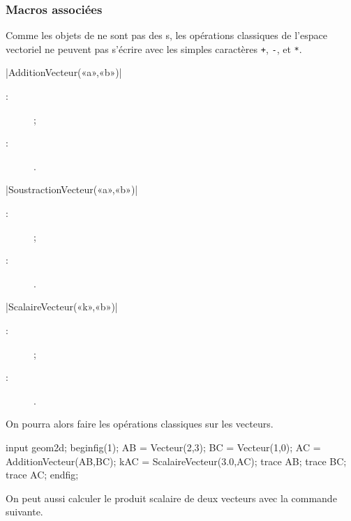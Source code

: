 \documentclass[a4paper,french]{article}
\begin{document}
\subsubsection{Macros associées}

Comme les objets de \mpgeomdd ne sont pas des s, les opérations classiques
de l'espace vectoriel ne peuvent pas s'écrire avec les simples caractères
\lstinline-+-, \lstinline+-+, et \lstinline-*-.

\begin{colourband}
\macro|AdditionVecteur(«a»,«b»)|
\begin{description}
  \item[:]  ;
  \item[:] .
\end{description}
\end{colourband}
\bigskip


\begin{colourband}
\macro|SoustractionVecteur(«a»,«b»)|
\begin{description}
  \item[:]  ;
  \item[:] .
\end{description}
\end{colourband}
\bigskip


\begin{colourband}
\macro|ScalaireVecteur(«k»,«b»)|
\begin{description}
  \item[:]  ;
  \item[:] .
\end{description}
\end{colourband}
\bigskip

On pourra alors faire les opérations classiques sur les vecteurs.

\begin{ExempleMP}
input geom2d;
beginfig(1);
AB = Vecteur(2,3);
BC = Vecteur(1,0);
AC = AdditionVecteur(AB,BC);
kAC = ScalaireVecteur(3.0,AC);
trace AB;
trace BC;
trace AC;
endfig;
\end{ExempleMP}

On peut aussi calculer le produit scalaire de deux vecteurs avec la commande
suivante.
\end{document}
